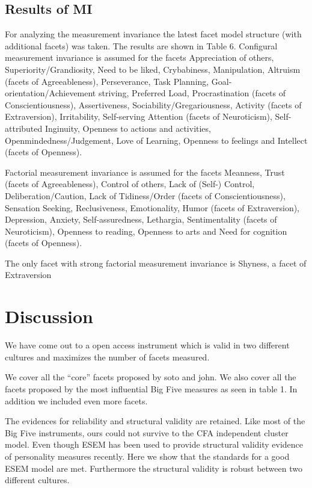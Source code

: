 \documentclass[,man,floatsintext]{apa6}
\theoremstyle{definition}
\theoremstyle{definition}
\theoremstyle{definition}
\theoremstyle{remark}
\begin{document}
\hypertarget{results-of-mi}{%
\subsection{Results of MI}\label{results-of-mi}}

For analyzing the measurement invariance the latest facet model
structure (with additional facets) was taken. The results are shown in
Table 6. Configural measurement invariance is assumed for the facets
Appreciation of others, Superiority/Grandiosity, Need to be liked,
Crybabiness, Manipulation, Altruism (facets of Agreeableness),
Perseverance, Task Planning, Goal-orientation/Achievement striving,
Preferred Load, Procrastination (facets of Conscientiousness),
Assertiveness, Sociability/Gregariousness, Activity (facets of
Extraversion), Irritability, Self-serving Attention (facets of
Neuroticism), Self-attributed Inginuity, Openness to actions and
activities, Openmindedness/Judgement, Love of Learning, Openness to
feelings and Intellect (facets of Openness).

Factorial measurement invariance is assumed for the facets Meanness,
Trust (facets of Agreeableness), Control of others, Lack of (Self-)
Control, Deliberation/Caution, Lack of Tidiness/Order (facets of
Conscientiousness), Sensation Seeking, Reclusiveness, Emotionality,
Humor (facets of Extraversion), Depression, Anxiety, Self-assuredness,
Lethargia, Sentimentality (facets of Neuroticism), Openness to reading,
Openness to arts and Need for cognition (facets of Openness).

The only facet with strong factorial measurement invariance is Shyness,
a facet of Extraversion

\hypertarget{discussion}{%
\section{Discussion}\label{discussion}}

We have come out to a open access instrument which is valid in two
different cultures and maximizes the number of facets measured.

We cover all the \enquote{core} facets proposed by soto and john. We
also cover all the facets proposed by the most influential Big Five
measures as seen in table 1. In addition we included even more facets.

The evidences for reliability and structural validity are retained. Like
most of the Big Five instruments, ours could not survive to the CFA
independent cluster model. Even though ESEM has been used to provide
structural validity evidence of personality measures recently. Here we
show that the standards for a good ESEM model are met. Furthermore the
structural validity is robust between two different cultures.
\end{document}
